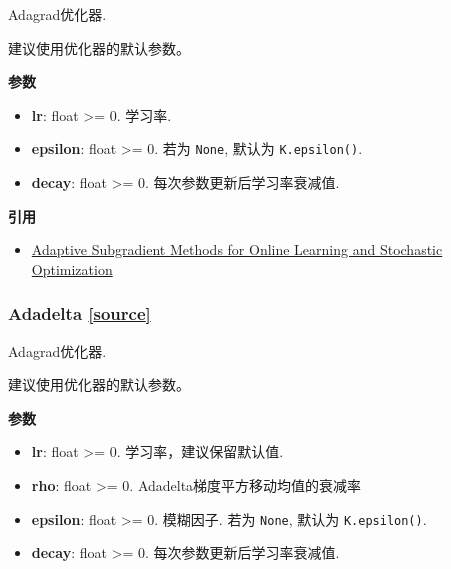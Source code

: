 Adagrad优化器.

建议使用优化器的默认参数。

\textbf{参数}

\begin{itemize}
\tightlist
\item
  \textbf{lr}: float \textgreater{}= 0. 学习率.
\item
  \textbf{epsilon}: float \textgreater{}= 0. 若为 \texttt{None}, 默认为
  \texttt{K.epsilon()}.
\item
  \textbf{decay}: float \textgreater{}= 0. 每次参数更新后学习率衰减值.
\end{itemize}

\textbf{引用}

\begin{itemize}
\tightlist
\item
  \href{http://www.jmlr.org/papers/volume12/duchi11a/duchi11a.pdf}{Adaptive
  Subgradient Methods for Online Learning and Stochastic Optimization}
\end{itemize}




\subsubsection{Adadelta {\href{https://github.com/keras-team/keras/blob/master/keras/optimizers.py\#L324}{{[}source{]}}}}

\begin{Shaded}
\begin{Highlighting}[]
\OperatorTok{=}\OperatorTok{=}\OperatorTok{=}\OperatorTok{=}\NormalTok{)}
\end{Highlighting}
\end{Shaded}

Adagrad优化器.

建议使用优化器的默认参数。

\textbf{参数}

\begin{itemize}
\tightlist
\item
  \textbf{lr}: float \textgreater{}= 0. 学习率，建议保留默认值.
\item
  \textbf{rho}: float \textgreater{}= 0.
  Adadelta梯度平方移动均值的衰减率
\item
  \textbf{epsilon}: float \textgreater{}= 0. 模糊因子. 若为
  \texttt{None}, 默认为 \texttt{K.epsilon()}.
\item
  \textbf{decay}: float \textgreater{}= 0. 每次参数更新后学习率衰减值.
\end{itemize}

